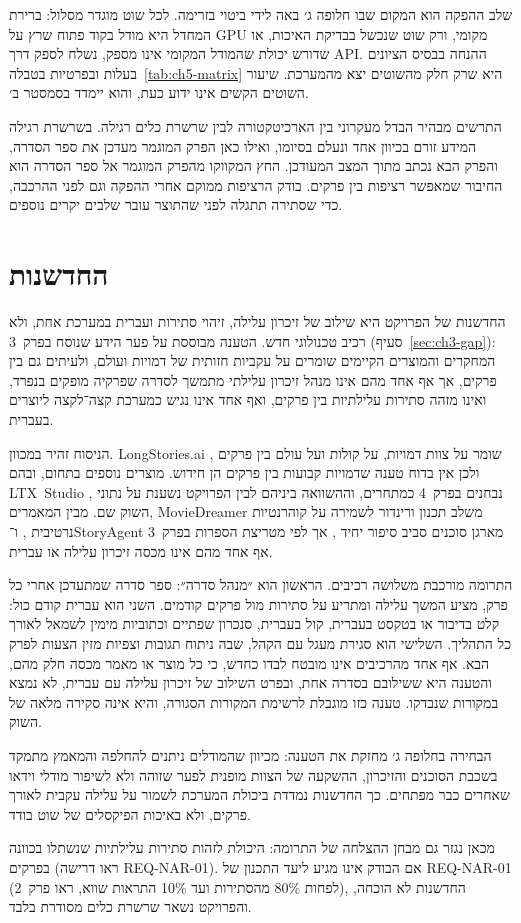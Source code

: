 שלב ההפקה הוא המקום שבו חלופה ג׳ באה לידי ביטוי בזרימה. לכל שוט מוגדר מסלול: ברירת המחדל היא מודל בקוד פתוח שרץ על \textenglish{GPU} מקומי, ורק שוט שנכשל בבדיקת האיכות, או שדורש יכולת שהמודל המקומי אינו מספק, נשלח לספק דרך \textenglish{API}. ההנחה בבסיס הציונים בעלות ובפרטיות בטבלה~\ref{tab:ch5-matrix} היא שרק חלק מהשוטים יצא מהמערכת. שיעור השוטים הקשים אינו ידוע כעת, והוא יימדד בסמסטר ב׳.

התרשים מבהיר הבדל מעקרוני בין הארכיטקטורה לבין שרשרת כלים רגילה. בשרשרת רגילה המידע זורם בכיוון אחד ונעלם בסיומו, ואילו כאן הפרק המוגמר מעדכן את ספר הסדרה, והפרק הבא נכתב מתוך המצב המעודכן. החץ המקווקו מהפרק המוגמר אל ספר הסדרה הוא החיבור שמאפשר רציפות בין פרקים. בודק הרציפות ממוקם אחרי ההפקה וגם לפני ההרכבה, כדי שסתירה תתגלה לפני שהתוצר עובר שלבים יקרים נוספים.

\section{החדשנות}
\label{sec:ch5-innovation}
החדשנות של הפרויקט היא שילוב של זיכרון עלילה, זיהוי סתירות ועברית במערכת אחת, ולא רכיב טכנולוגי חדש. הטענה מבוססת על פער הידע שנוסח בפרק~3 (סעיף~\ref{sec:ch3-gap}): המחקרים והמוצרים הקיימים שומרים על עקביות חזותית של דמויות ועולם, ולעיתים גם בין פרקים, אך אף אחד מהם אינו מנהל זיכרון עלילתי מתמשך לסדרה שפרקיה מופקים בנפרד, ואינו מזהה סתירות עלילתיות בין פרקים, ואף אחד אינו נגיש כמערכת קצה־לקצה ליוצרים בעברית.

הניסוח זהיר במכוון. \textenglish{LongStories.ai} שומר על צוות דמויות, על קולות ועל עולם בין פרקים \cite{longstories}, ולכן אין בדוח טענה שדמויות קבועות בין פרקים הן חידוש. מוצרים נוספים בתחום, ובהם \mbox{\textenglish{LTX Studio}} \cite{ltxstudio}, נבחנים בפרק~4 כמתחרים, וההשוואה ביניהם לבין הפרויקט נשענת על נתוני השוק שם. מבין המאמרים, \textenglish{MovieDreamer} משלב תכנון ורינדור לשמירה על קוהרנטיות נרטיבית \cite{zhao2025moviedreamer}, ו־\textenglish{StoryAgent} מארגן סוכנים סביב סיפור יחיד \cite{hu2024storyagent}, אך לפי מטריצת הספרות בפרק~3 אף אחד מהם אינו מכסה זיכרון עלילה או עברית.

התרומה מורכבת משלושה רכיבים. הראשון הוא ״מנהל סדרה״: ספר סדרה שמתעדכן אחרי כל פרק, מציע המשך עלילה ומתריע על סתירות מול פרקים קודמים. השני הוא עברית קודם כול: קלט בדיבור או בטקסט בעברית, קול בעברית, סנכרון שפתיים וכתוביות מימין לשמאל לאורך כל התהליך. השלישי הוא סגירת מעגל עם הקהל, שבה ניתוח תגובות וצפיות מזין הצעות לפרק הבא. אף אחד מהרכיבים אינו מובטח לבדו כחדש, כי כל מוצר או מאמר מכסה חלק מהם, והטענה היא ששילובם בסדרה אחת, ובפרט השילוב של זיכרון עלילה עם עברית, לא נמצא במקורות שנבדקו. טענה כזו מוגבלת לרשימת המקורות הסגורה, והיא אינה סקירה מלאה של השוק.

הבחירה בחלופה ג׳ מחזקת את הטענה: מכיוון שהמודלים ניתנים להחלפה והמאמץ מתמקד בשכבת הסוכנים והזיכרון, ההשקעה של הצוות מופנית לפער שזוהה ולא לשיפור מודלי וידאו שאחרים כבר מפתחים. כך החדשנות נמדדת ביכולת המערכת לשמור על עלילה עקבית לאורך פרקים, ולא באיכות הפיקסלים של שוט בודד.

מכאן נגזר גם מבחן ההצלחה של התרומה: היכולת לזהות סתירות עלילתיות שנשתלו בכוונה בפרקים (ראו דרישה \textenglish{REQ-NAR-01}). אם הבודק אינו מגיע ליעד התכנון של \textenglish{REQ-NAR-01} (לפחות 80\% מהסתירות ועד 10\% התראות שווא, ראו פרק~2), החדשנות לא הוכחה, והפרויקט נשאר שרשרת כלים מסודרת בלבד.
